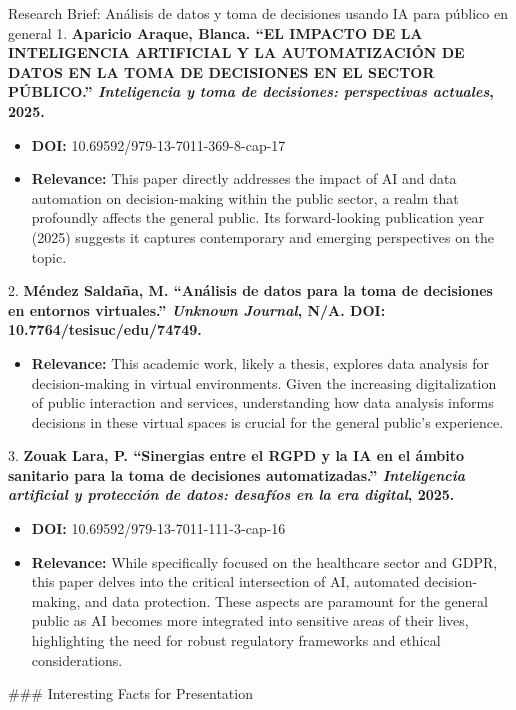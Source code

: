 \documentclass[aspectratio=169]{beamer}
\begin{document}
\begin{frame}[fragile]{Research Brief: Análisis de datos y toma de decisiones usando IA para público en general}
1.  \textbf{Aparicio Araque, Blanca. ``EL IMPACTO DE LA INTELIGENCIA ARTIFICIAL Y LA AUTOMATIZACIÓN DE DATOS EN LA TOMA DE DECISIONES EN EL SECTOR PÚBLICO.'' \textit{Inteligencia y toma de decisiones: perspectivas actuales}, 2025.}
\begin{itemize}
  \begin{itemize}
    \item \textbf{DOI:} 10.69592/979-13-7011-369-8-cap-17
    \item \textbf{Relevance:} This paper directly addresses the impact of AI and data automation on decision-making within the public sector, a realm that profoundly affects the general public. Its forward-looking publication year (2025) suggests it captures contemporary and emerging perspectives on the topic.
  \end{itemize}
\end{itemize}
2.  \textbf{Méndez Saldaña, M. ``Análisis de datos para la toma de decisiones en entornos virtuales.'' \textit{Unknown Journal}, N/A. DOI: 10.7764/tesisuc/edu/74749.}
\begin{itemize}
  \begin{itemize}
    \item \textbf{Relevance:} This academic work, likely a thesis, explores data analysis for decision-making in virtual environments. Given the increasing digitalization of public interaction and services, understanding how data analysis informs decisions in these virtual spaces is crucial for the general public's experience.
  \end{itemize}
\end{itemize}
3.  \textbf{Zouak Lara, P. ``Sinergias entre el RGPD y la IA en el ámbito sanitario para la toma de decisiones automatizadas.'' \textit{Inteligencia artificial y protección de datos: desafíos en la era digital}, 2025.}
\begin{itemize}
  \begin{itemize}
    \item \textbf{DOI:} 10.69592/979-13-7011-111-3-cap-16
    \item \textbf{Relevance:} While specifically focused on the healthcare sector and GDPR, this paper delves into the critical intersection of AI, automated decision-making, and data protection. These aspects are paramount for the general public as AI becomes more integrated into sensitive areas of their lives, highlighting the need for robust regulatory frameworks and ethical considerations.
  \end{itemize}
\end{itemize}
### Interesting Facts for Presentation


\end{frame}
\end{document}
